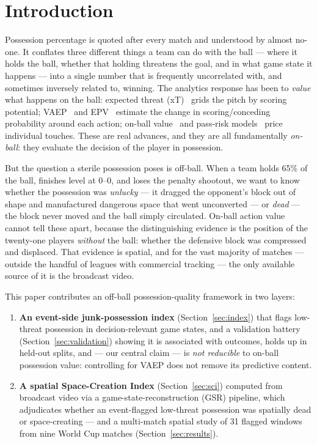 \documentclass[11pt]{article}
\begin{document}
\section{Introduction}
\label{sec:intro}

Possession percentage is quoted after every match and understood by almost
no-one. It conflates three different things a team can do with the ball ---
where it holds the ball, whether that holding threatens the goal, and in what
game state it happens --- into a single number that is frequently uncorrelated
with, and sometimes inversely related to, winning. The analytics response has
been to \emph{value} what happens on the ball: expected threat
(xT)~\citep{singh2019xt} grids the pitch by scoring potential; VAEP~\citep{decroos2019actions}
and EPV~\citep{fernandez2021epv} estimate the change in scoring/conceding
probability around each action; on-ball value~\citep{statsbomb2021obv} and
pass-risk models~\citep{power2017passes,link2016dfl} price individual
touches. These are real advances, and they are all fundamentally
\emph{on-ball}: they evaluate the decision of the player in possession.

But the question a sterile possession poses is off-ball. When a team holds 65\%
of the ball, finishes level at 0--0, and loses the penalty shootout, we want to
know whether the possession was \emph{unlucky} --- it dragged the opponent's block out of shape
and manufactured dangerous space that went unconverted --- or \emph{dead} ---
the block never moved and the ball simply circulated. On-ball action value
cannot tell these apart, because the distinguishing evidence is the position of
the twenty-one players \emph{without} the ball: whether the defensive block was
compressed and displaced. That evidence is spatial, and for the vast majority
of matches --- outside the handful of leagues with commercial tracking --- the
only available source of it is the broadcast video.

This paper contributes an off-ball possession-quality framework in two layers:

\begin{enumerate}
\item \textbf{An event-side junk-possession index} (Section~\ref{sec:index})
that flags low-threat possession in decision-relevant game states, and a
validation battery (Section~\ref{sec:validation}) showing it is associated with
outcomes, holds up in held-out splits, and --- our central claim --- is
\emph{not reducible} to on-ball possession value: controlling for VAEP does not
remove its predictive content.
\item \textbf{A spatial Space-Creation Index} (Section~\ref{sec:sci}) computed
from broadcast video via a game-state-reconstruction (GSR) pipeline, which
adjudicates whether an event-flagged low-threat possession was spatially dead or
space-creating --- and a multi-match spatial study of 31 flagged windows from
nine World Cup matches (Section~\ref{sec:results}).
\end{enumerate}
\end{document}
